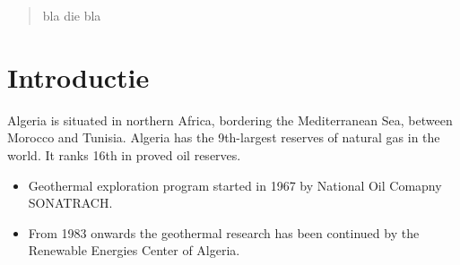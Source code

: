 \documentclass[a1,portrait]{a0poster}
\begin{document}
\vspace{1cm} %


\begin{multicols}{3} %


\color{Navy} %

\begin{abstract}
bla die bla
\end{abstract}

\color{Black} %
\section*{Introductie}
Algeria is situated in \cite{Block_2011} northern Africa, bordering the Mediterranean Sea, between Morocco and Tunisia. Algeria has the 9th-largest reserves of natural gas in the world. It ranks 16th in proved oil reserves.  
\begin{itemize}
\item Geothermal exploration program started in 1967 by National Oil Comapny SONATRACH.
\item From 1983 onwards the geothermal research has been continued by the Renewable Energies Center of Algeria.
\end{itemize}

\color{Black} %


\end{multicols}
\end{document}
